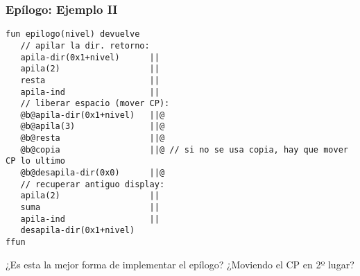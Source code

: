 \documentclass[hyperref={pdfpagelabels=false},tree-dvips,compress]{beamer}
\begin{document}
\begin{frame}[fragile]
\frametitle{Epílogo: Ejemplo II}

\begin{lstlisting}[style=codigoMP,basicstyle=\tiny\ttfamily]
fun epilogo(nivel) devuelve
   // apilar la dir. retorno:
   apila-dir(0x1+nivel)      ||
   apila(2)                  ||
   resta                     ||
   apila-ind                 ||
   // liberar espacio (mover CP):
   @b@apila-dir(0x1+nivel)   ||@
   @b@apila(3)               ||@
   @b@resta                  ||@
   @b@copia                  ||@ // si no se usa copia, hay que mover CP lo ultimo
   @b@desapila-dir(0x0)      ||@
   // recuperar antiguo display:
   apila(2)                  ||
   suma                      ||
   apila-ind                 ||
   desapila-dir(0x1+nivel)
ffun
\end{lstlisting}

¿Es esta la mejor forma de implementar el epílogo? ¿Moviendo el CP en 2º lugar?

\end{frame}
\end{document}

